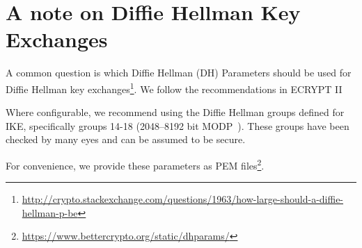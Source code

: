 \section{A note on Diffie Hellman Key Exchanges}
\label{section:DH}

A common question is which Diffie Hellman (DH) Parameters  should be used for
Diffie Hellman key
exchanges\footnote{\url{http://crypto.stackexchange.com/questions/1963/how-large-should-a-diffie-hellman-p-be}}.
We follow the recommendations in ECRYPT II~\cite[chapter 16]{ii2011ecrypt}

Where configurable, we recommend using the Diffie Hellman groups
defined for IKE, specifically groups 14-18 (2048--8192 bit MODP~\cite{rfc3526}).
These groups have been checked by many eyes and can be assumed to be secure.

For convenience, we provide these parameters as PEM files\footnote{\url{https://www.bettercrypto.org/static/dhparams/}}. 

